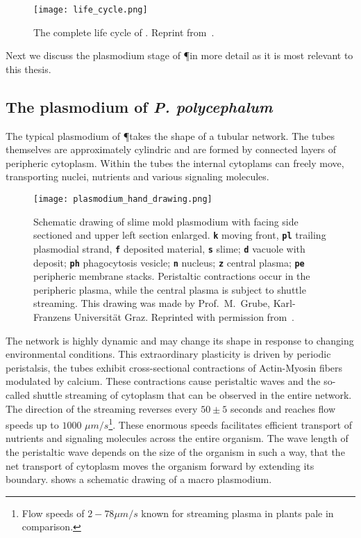 		\begin{figure}[ht]
			\centering
			\texttt{[image: life\_cycle.png]}
			\caption[Life cycle of \P]{The complete life cycle of \Pp. Reprint from~\cite{Sauer1986}.}
			\label{fig:life_cycle}
		\end{figure}

		Next we discuss the plasmodium stage of \P in more detail as it is most relevant to this thesis.

	\subsection{The plasmodium of \textit{P. polycephalum}}

		The typical plasmodium of \P takes the shape of a tubular network. The tubes themselves are approximately cylindric and are formed by connected layers of peripheric cytoplasm. Within the tubes the internal cytoplams can freely move, transporting nuclei, nutrients and various signaling molecules. 

		\begin{figure}[ht]
			\centering
			\texttt{[image: plasmodium\_hand\_drawing.png]}
			\caption[Schematic drawing of the plasmodium of \P]{Schematic drawing of slime mold plasmodium with facing side sectioned and upper left section enlarged. \textbf{\texttt{k}} moving front, \textbf{\texttt{pl}} trailing plasmodial strand, \textbf{\texttt{f}} deposited material, \textbf{\texttt{s}} slime; \textbf{\texttt{d}} vacuole with deposit; \textbf{\texttt{ph}} phagocytosis vesicle; \textbf{\texttt{n}} nucleus; \textbf{\texttt{z}} central plasma; \textbf{\texttt{pe}} peripheric membrane stacks. Peristaltic contractions occur in the peripheric plasma, while the central plasma is subject to shuttle streaming. This drawing was made by Prof.~M.~Grube, Karl-Franzens Universit\"at Graz. Reprinted with permission from~\cite{grube2016physarum}.}
			\label{fig:plasmodium_hand_drawing}
		\end{figure}

		The network is highly dynamic and may change its shape in response to changing environmental conditions. This extraordinary plasticity is driven by periodic peristalsis, \ie the tubes exhibit cross-sectional contractions of Actin-Myosin fibers modulated by calcium. These contractions cause peristaltic waves and the so-called shuttle streaming of cytoplasm that can be observed in the entire network. The direction of the streaming reverses every $50 \pm 5$ seconds and reaches flow speeds up to $1000$ $\mu m/s$\footnote{Flow speeds of $2-78 \mu m/s$ known for streaming plasma in plants pale in comparison.}. These enormous speeds facilitates efficient transport of nutrients and signaling molecules across the entire organism. The wave length of the peristaltic wave depends on the size of the organism in such a way, that the net transport of cytoplasm moves the organism forward by extending its boundary.  shows a schematic drawing of a macro plasmodium.


